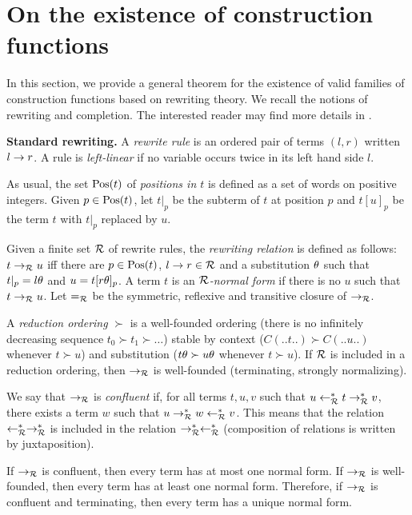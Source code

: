 
\section{On the existence of construction functions}
\label{sec-ex}

In this section, we provide a general theorem for the existence of
valid families of construction functions based on rewriting theory. We
recall the notions of rewriting and completion. The interested reader
may find more details in \cite{dershowitz90book}.\vsp[1mm]

\noindent
{\bf Standard rewriting.} A {\em rewrite rule} is an ordered pair of
terms $(l,r)$ written $l\rightarrow r$. A rule is {\em left-linear} if no
variable occurs twice in its left hand side $l$.

As usual, the set $\mathrm{Pos}(t)$ of {\em positions in $t$} is defined as a
set of words on positive integers. Given $p\in\mathrm{Pos}(t)$, let $t|_p$ be
the subterm of $t$ at position $p$ and $t[u]_p$ be the term $t$ with
$t|_p$ replaced by $u$.

Given a finite set $\mathcal{R}$ of rewrite rules, the {\em rewriting
relation} is defined as follows: $t\rightarrow_\mathcal{R} u$ iff there are
$p\in\mathrm{Pos}(t)$, $l\rightarrow r\in\mathcal{R}$ and a substitution $\theta$ such that
$t|_p=l\theta$ and $u=t[r\theta]_p$. A term $t$ is an {\em $\mathcal{R}$-normal form}
if there is no $u$ such that $t\rightarrow_\mathcal{R} u$. Let $=_\mathcal{R}$ be the
symmetric, reflexive and transitive closure of $\rightarrow_\mathcal{R}$.

A {\em reduction ordering} $\succ$ is a well-founded ordering (there
is no infinitely decreasing sequence $t_0\succ t_1\succ\ldots$) stable
by context ($C(..t..)\succ C(..u..)$ whenever $t\succ u$) and
substitution ($t\theta\succ u\theta$ whenever $t\succ u$). If $\mathcal{R}$ is
included in a reduction ordering, then $\rightarrow_\mathcal{R}$ is well-founded
(terminating, strongly normalizing).

We say that $\rightarrow_\mathcal{R}$ is {\em confluent} if, for all terms $t,u,v$ such
that $u\leftarrow^*_\mathcal{R} t\rightarrow^*_\mathcal{R} v$, there exists a term $w$ such that
$u\rightarrow^*_\mathcal{R} w\leftarrow^*_\mathcal{R} v$. This means that the relation
$\leftarrow^*_\mathcal{R}\rightarrow^*_\mathcal{R}$ is included in the relation $\rightarrow^*_\mathcal{R}\leftarrow^*_\mathcal{R}$
(composition of relations is written by juxtaposition).

If $\rightarrow_\mathcal{R}$ is confluent, then every term has at most one normal
form. If $\rightarrow_\mathcal{R}$ is well-founded, then every term has at least one
normal form. Therefore, if $\rightarrow_\mathcal{R}$ is confluent and terminating, then
every term has a unique normal form.\vsp[1mm]

